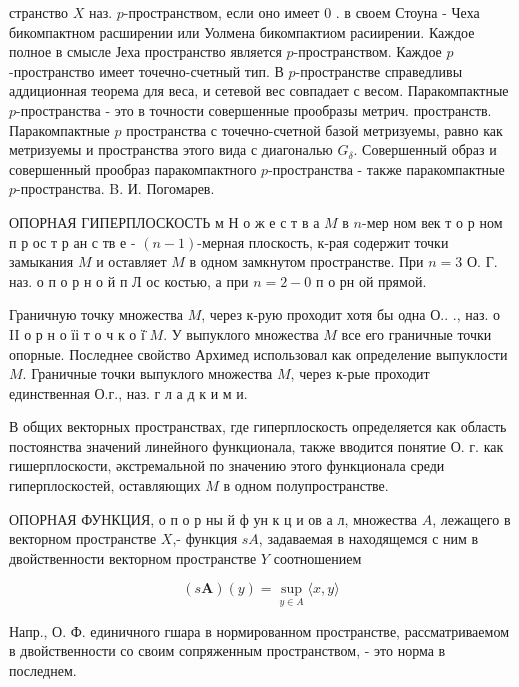 \documentclass[10pt]{article}
\begin{document}
странство $X$ наз. $p$-пространством, если оно имеет 0 . в своем Стоуна - Чеха бикомпактном расширении или Уолмена бикомпактиом расиирении. Каждое полное в смысле Јеха пространство является $p$-пространством. Каждое $p$-пространство имеет точечно-счетный тип. В $p$-пространстве справедливы аддиционная теорема для веса, и сетевой вес совпадает с весом. Паракомпактные $p$-пространства - это в точности совершенные прообразы метрич. пространств. Паракомпактные $p$ пространства с точечно-счетной базой метризуемы, равно как метризуемы и пространства этого вида с диагональю $G_{\delta}$. Совершенный образ и совершенный прообраз паракомпактного $p$-пространства - также паракомпактные $p$-пространства. B. И. Погомарев.



ОПОРНАЯ ГИПЕРПЛОСКОСТЬ м Н о ж е с т в а $M$ в $n$-мер ном век т о р ном п р ос т р ан с тв е - $(n-1)$-мерная плоскость, к-рая содержит точки замыкания $M$ и оставляет $M$ в одном замкнутом пространстве. При $n=3$ О. Г. наз. о п о р н о й п Л ос костью, а при $n=2-0$ п о рн ой прямой.



Граничную точку множества $M$, через к-рую проходит хотя бы одна О.. ., наз. о II о р н о їі т о ч к о ї̈ $M$. У выпуклого множества $M$ все его граничные точки опорные. Последнее свойство Архимед использовал как определение выпуклости $M$. Граничные точки выпуклого множества $M$, через к-рые проходит единственная О.г., наз. г л а д к и м и.



В общих векторных пространствах, где гиперплоскость определяется как область постоянства значений линейного функционала, также вводится понятие О. г. как гишерплоскости, әкстремальной по значению этого функционала среди гиперплоскостей, оставляющих $M$ в одном полупространстве.



ОПОРНАЯ ФУНКЦИЯ, о п о р ны й ф ун к ц и ов а л, множества $A$, лежащего в векторном пространстве $X$,- функция $s A$, задаваемая в находящемся с ним в двойственности векторном пространстве $Y$ соотношением



\[

(s \boldsymbol{A})(y)=\sup _{y \in A}\langle x, y\rangle

\]



Напр., О. Ф. единичного гшара в нормированном пространстве, рассматриваемом в двойственности со своим сопряженным пространством, - это норма в последнем.
\end{document}
